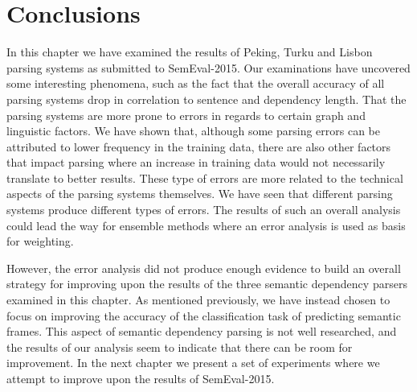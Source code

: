 \section{Conclusions}

In this chapter we have examined the results of Peking, Turku and Lisbon parsing systems as submitted to SemEval-2015. Our examinations have uncovered some interesting phenomena, such as the fact that the overall accuracy of all parsing systems drop in correlation to sentence and dependency length. That the parsing systems are more prone to errors in regards to certain graph and linguistic factors. We have shown that, although some parsing errors can be attributed to lower frequency in the training data, there are also other factors that impact parsing where an increase in training data would not necessarily translate to better results. These type of errors are more related to the technical aspects of the parsing systems themselves. We have seen that different parsing systems produce different types of errors. The results of such an overall analysis could lead the way for ensemble methods where an error analysis is used as basis for weighting.

However, the error analysis did not produce enough evidence to build an overall strategy for improving upon the results of the three semantic dependency parsers examined in this chapter. As mentioned previously, we have instead chosen to focus on improving the accuracy of the classification task of predicting semantic frames. This aspect of semantic dependency parsing is not well researched, and the results of our analysis seem to indicate that there can be room for improvement. In the next chapter we present a set of experiments where we attempt to improve upon the results of SemEval-2015.

